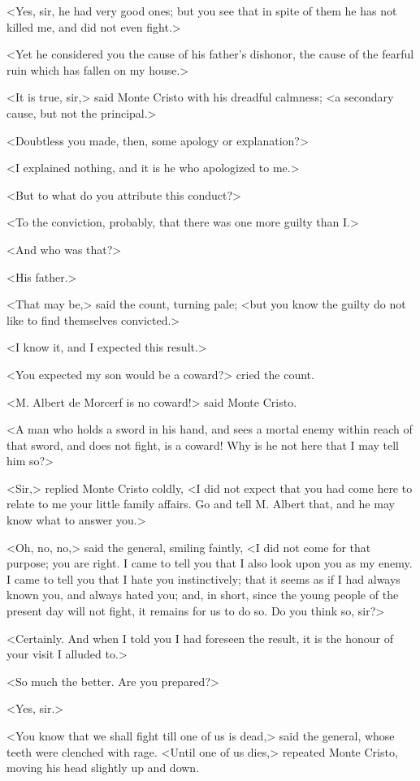  <Yes, sir, he had very good ones; but you see that in spite of them he has not killed me, and did not even fight.> 

 <Yet he considered you the cause of his father's dishonor, the cause of the fearful ruin which has fallen on my house.> 

 <It is true, sir,> said Monte Cristo with his dreadful calmness; <a secondary cause, but not the principal.> 

 <Doubtless you made, then, some apology or explanation?> 

 <I explained nothing, and it is he who apologized to me.> 

 <But to what do you attribute this conduct?> 

 <To the conviction, probably, that there was one more guilty than I.> 

 <And who was that?> 

 <His father.> 

 <That may be,> said the count, turning pale; <but you know the guilty do not like to find themselves convicted.> 

 <I know it, and I expected this result.> 

 <You expected my son would be a coward?> cried the count. 

 <M. Albert de Morcerf is no coward!> said Monte Cristo. 

 <A man who holds a sword in his hand, and sees a mortal enemy within reach of that sword, and does not fight, is a coward! Why is he not here that I may tell him so?> 

 <Sir,> replied Monte Cristo coldly, <I did not expect that you had come here to relate to me your little family affairs. Go and tell M. Albert that, and he may know what to answer you.> 

 <Oh, no, no,> said the general, smiling faintly, <I did not come for that purpose; you are right. I came to tell you that I also look upon you as my enemy. I came to tell you that I hate you instinctively; that it seems as if I had always known you, and always hated you; and, in short, since the young people of the present day will not fight, it remains for us to do so. Do you think so, sir?> 

 <Certainly. And when I told you I had foreseen the result, it is the honour of your visit I alluded to.> 

 <So much the better. Are you prepared?> 

 <Yes, sir.> 

 <You know that we shall fight till one of us is dead,> said the general, whose teeth were clenched with rage.  <Until one of us dies,> repeated Monte Cristo, moving his head slightly up and down. 

